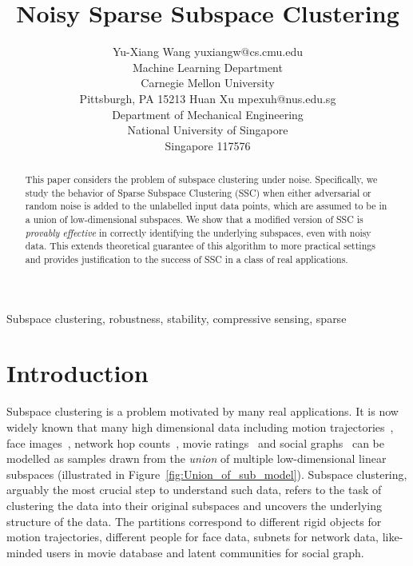\documentclass[twoside,11pt]{article}
\numberwithin{equation}{section}
\begin{document}
\title{Noisy Sparse Subspace Clustering}

\author{\name Yu-Xiang Wang \email yuxiangw@cs.cmu.edu \\
       \addr Machine Learning Department\\
       Carnegie Mellon University\\
       Pittsburgh, PA 15213
       \AND
       \name Huan Xu \email mpexuh@nus.edu.sg\\
       \addr Department of Mechanical Engineering\\
       National University of Singapore\\
       Singapore 117576}


\maketitle

\begin{abstract}%
This paper considers the problem of subspace clustering under noise. Specifically, we study the behavior of Sparse Subspace Clustering (SSC) when either adversarial or random noise is added to the unlabelled input data points, which are assumed to be in a union of low-dimensional subspaces.
We show that a modified version of SSC is \emph{provably effective} in correctly identifying the underlying subspaces, even with noisy data. This extends theoretical guarantee of this algorithm to more practical settings and provides justification to the success of SSC in a class of real applications.
\end{abstract}

\begin{keywords}
  Subspace clustering, robustness, stability, compressive sensing, sparse
\end{keywords}

\section{Introduction}


Subspace clustering is a problem motivated by many real applications. It is now widely known that many high dimensional data including motion trajectories~\citep{costeira1998motion_seg}, face images~\citep{basri2003lambertianface}, network hop counts~\citep{eriksson2011high_rankMC}, movie ratings~\citep{zhang2012RecSys} and social graphs~\citep{xu2011graphclustering} can be modelled as samples drawn from the {\em union} of multiple low-dimensional linear subspaces (illustrated in Figure~\ref{fig:Union_of_sub_model}). Subspace clustering, arguably the most crucial step to understand such data, refers to the task of clustering the data into their original subspaces and uncovers the underlying structure of the data. The partitions correspond to different rigid objects for motion trajectories, different people for face data, subnets for network data, like-minded users in movie database and latent communities for social graph.
\end{document}

